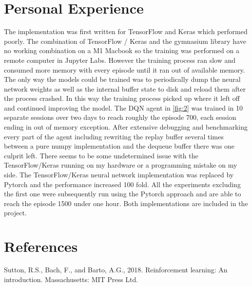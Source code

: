 \documentclass{article}
\begin{document}
\section{Personal Experience}
The implementation was first written for TensorFlow and Keras which performed poorly. The combination of TensorFlow / Keras and the gymnasium library have no working combination on a M1 Macbook so the training was performed on a remote computer in Jupyter Labs. However the training process ran  slow and consumed more memory with every episode until it ran out of available memory. The only way the models could be trained was to periodically dump the neural network weights as well as the internal buffer state to disk and reload them after the process crashed. In this way the training process picked up where it left off and continued improving the model. The DQN agent in \ref{fig:2} was trained in 10 separate sessions over two days to reach roughly the episode 700, each session ending in out of memory exception.  After extensive debugging and benchmarking every part of the agent including rewriting the replay buffer several times between a pure numpy implementation and the dequeue buffer there was one culprit left. There seems to be some undetermined issue with the TensorFlow/Keras running on my hardware or a programming mistake on my side. The TensorFlow/Keras neural network implementation was replaced by Pytorch and the performance increased 100 fold. All the experiments excluding the first one were subsequently run using the Pytorch approach and are able to reach the episode 1500 under one hour. Both implementations are included in the project.

\section*{References}
\small Sutton, R.S., Bach, F., and Barto, A.G., 2018. Reinforcement learning: An introduction. Massachusetts: MIT Press Ltd. 

\normalsize
\newpage
\end{document}
